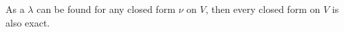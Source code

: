 \documentclass{exam}
\numberwithin{equation}{section}
\begin{document}
    As a \(\lambda\) can be found for any closed form \(\nu\) on \(V\), then every closed form on \(V\) is also exact.

    


\end{document}
